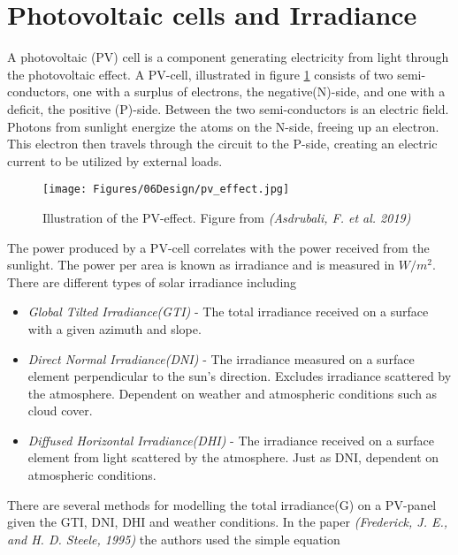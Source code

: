 \section{Photovoltaic cells and Irradiance}\label{seq:pv_and_irradiance}

A photovoltaic (PV) cell is a component generating electricity from light through the photovoltaic effect. A PV-cell, illustrated in figure \ref{fig:pv-effect} consists of two semi-conductors, one with a surplus of electrons, the negative(N)-side, and one with a deficit, the positive (P)-side. Between the two semi-conductors is an electric field. Photons from sunlight energize the atoms on the N-side, freeing up an electron. This electron then travels through the circuit to the P-side, creating an electric current to be utilized by external loads.\\

\begin{figure}
    \centering
    \texttt{[image: Figures/06Design/pv\_effect.jpg]}
    \caption[PV-effect]{Illustration of the PV-effect. Figure from \textit{(Asdrubali, F. et al. 2019)} \cite{Asdrubali2019441}}
    \label{fig:pv-effect}
\end{figure}

The power produced by a PV-cell correlates with the power received from the sunlight.\cite{Frederick1995} The power per area is known as irradiance and is measured in $W/m^2$. There are different types of solar irradiance including
\begin{itemize}
    \item \textit{Global Tilted Irradiance(GTI)}    -   The total irradiance received on a surface with a given azimuth and slope.
    \item \textit{Direct Normal Irradiance(DNI)}    -   The irradiance measured on a surface element perpendicular to the sun's direction. Excludes irradiance scattered by the atmosphere. Dependent on weather and atmospheric conditions such as cloud cover.
    \item \textit{Diffused Horizontal Irradiance(DHI)}  -   The irradiance received on a surface element from light scattered by the atmosphere. Just as DNI, dependent on atmospheric conditions.
\end{itemize}

There are several methods for modelling the total irradiance(G) on a PV-panel given the GTI, DNI, DHI and weather conditions. In the paper \textit{(Frederick, J. E., and H. D. Steele, 1995)} the authors used the simple equation

